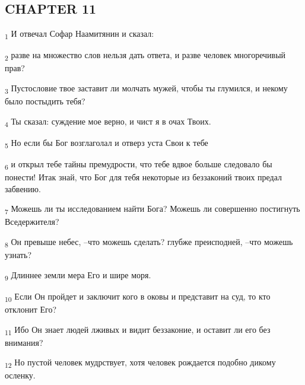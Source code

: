 \subsection{CHAPTER 11}
\begin{tcolorbox}
\textsubscript{1} И отвечал Софар Наамитянин и сказал:
\end{tcolorbox}
\begin{tcolorbox}
\textsubscript{2} разве на множество слов нельзя дать ответа, и разве человек многоречивый прав?
\end{tcolorbox}
\begin{tcolorbox}
\textsubscript{3} Пустословие твое заставит ли молчать мужей, чтобы ты глумился, и некому было постыдить тебя?
\end{tcolorbox}
\begin{tcolorbox}
\textsubscript{4} Ты сказал: суждение мое верно, и чист я в очах Твоих.
\end{tcolorbox}
\begin{tcolorbox}
\textsubscript{5} Но если бы Бог возглаголал и отверз уста Свои к тебе
\end{tcolorbox}
\begin{tcolorbox}
\textsubscript{6} и открыл тебе тайны премудрости, что тебе вдвое больше следовало бы понести! Итак знай, что Бог для тебя некоторые из беззаконий твоих предал забвению.
\end{tcolorbox}
\begin{tcolorbox}
\textsubscript{7} Можешь ли ты исследованием найти Бога? Можешь ли совершенно постигнуть Вседержителя?
\end{tcolorbox}
\begin{tcolorbox}
\textsubscript{8} Он превыше небес, --что можешь сделать? глубже преисподней, --что можешь узнать?
\end{tcolorbox}
\begin{tcolorbox}
\textsubscript{9} Длиннее земли мера Его и шире моря.
\end{tcolorbox}
\begin{tcolorbox}
\textsubscript{10} Если Он пройдет и заключит кого в оковы и представит на суд, то кто отклонит Его?
\end{tcolorbox}
\begin{tcolorbox}
\textsubscript{11} Ибо Он знает людей лживых и видит беззаконие, и оставит ли его без внимания?
\end{tcolorbox}
\begin{tcolorbox}
\textsubscript{12} Но пустой человек мудрствует, хотя человек рождается подобно дикому осленку.
\end{tcolorbox}
